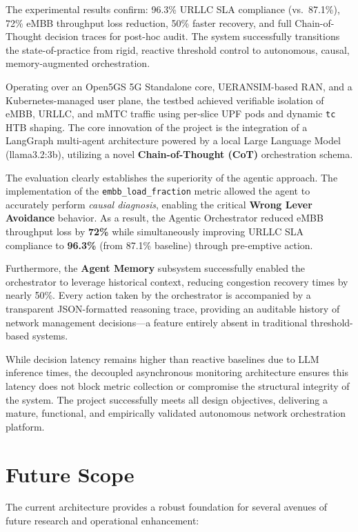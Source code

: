 The experimental results confirm: 96.3\% URLLC SLA compliance (vs.\ 87.1\%), 72\% eMBB throughput loss reduction, 50\% faster recovery, and full Chain-of-Thought decision traces for post-hoc audit. The system successfully transitions the state-of-practice from rigid, reactive threshold control to autonomous, causal, memory-augmented orchestration.


Operating over an Open5GS 5G Standalone core, UERANSIM-based RAN, and a Kubernetes-managed user plane, the testbed achieved verifiable isolation of eMBB, URLLC, and mMTC traffic using per-slice UPF pods and dynamic \texttt{tc} HTB shaping. The core innovation of the project is the integration of a LangGraph multi-agent architecture powered by a local Large Language Model (llama3.2:3b), utilizing a novel \textbf{Chain-of-Thought (CoT)} orchestration schema.

The evaluation clearly establishes the superiority of the agentic approach. The implementation of the \texttt{embb\_load\_fraction} metric allowed the agent to accurately perform \textit{causal diagnosis}, enabling the critical \textbf{Wrong Lever Avoidance} behavior. As a result, the Agentic Orchestrator reduced eMBB throughput loss by \textbf{72\%} while simultaneously improving URLLC SLA compliance to \textbf{96.3\%} (from 87.1\% baseline) through pre-emptive action.

Furthermore, the \textbf{Agent Memory} subsystem successfully enabled the orchestrator to leverage historical context, reducing congestion recovery times by nearly 50\%. Every action taken by the orchestrator is accompanied by a transparent JSON-formatted reasoning trace, providing an auditable history of network management decisions---a feature entirely absent in traditional threshold-based systems.

While decision latency remains higher than reactive baselines due to LLM inference times, the decoupled asynchronous monitoring architecture ensures this latency does not block metric collection or compromise the structural integrity of the system. The project successfully meets all design objectives, delivering a mature, functional, and empirically validated autonomous network orchestration platform.

\section{Future Scope}

The current architecture provides a robust foundation for several avenues of future research and operational enhancement:

